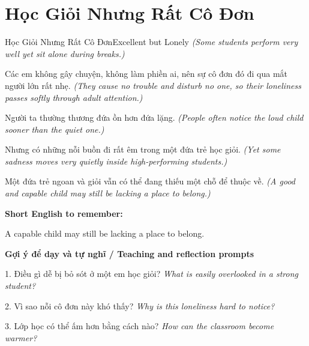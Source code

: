 \section{Học Giỏi Nhưng Rất Cô Đơn}
\begin{truyen}{Học Giỏi Nhưng Rất Cô Đơn}{Excellent but Lonely}
\textit{(Some students perform very well yet sit alone during breaks.)}

Các em không gây chuyện, không làm phiền ai, nên sự cô đơn đó đi qua mắt người lớn rất nhẹ.
\textit{(They cause no trouble and disturb no one, so their loneliness passes softly through adult attention.)}

Người ta thường thương đứa ồn hơn đứa lặng.
\textit{(People often notice the loud child sooner than the quiet one.)}

Nhưng có những nỗi buồn đi rất êm trong một đứa trẻ học giỏi.
\textit{(Yet some sadness moves very quietly inside high-performing students.)}

\end{truyen}

\begin{baihoc}
Một đứa trẻ ngoan và giỏi vẫn có thể đang thiếu một chỗ để thuộc về.
\textit{(A good and capable child may still be lacking a place to belong.)}
\end{baihoc}

\begin{ghinhoanh}
\textbf{Short English to remember:}

A capable child may still be lacking a place to belong.

\end{ghinhoanh}

\begin{tuhocnhanh}
\textbf{Gợi ý để dạy và tự nghĩ / Teaching and reflection prompts}

1. Điều gì dễ bị bỏ sót ở một em học giỏi? \textit{What is easily overlooked in a strong student?}

2. Vì sao nỗi cô đơn này khó thấy? \textit{Why is this loneliness hard to notice?}

3. Lớp học có thể ấm hơn bằng cách nào? \textit{How can the classroom become warmer?}
\end{tuhocnhanh}
\ngancach

